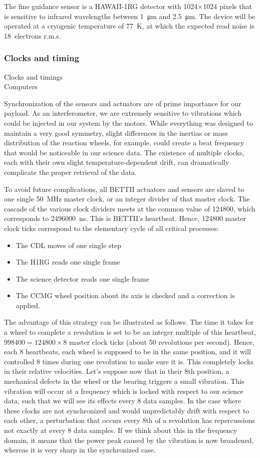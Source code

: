 The fine guidance sensor is a HAWAII-1RG detector with 1024$\times$1024 pixels that is sensitive to infrared wavelengths between \SI{1}{\um} and \SI{2.5}{\um}. The device will be operated at a cryogenic temperature of \SI{77}{\kelvin}, at which the expected read noise is 18~electrons r.m.s.

\subsubsection{Clocks and timing}
Clocks and timings \\
Computers

Synchronization of the sensors and actuators are of prime importance for our payload. As an interferometer, we are extremely sensitive to vibrations which could be injected in our system by the motors. While everything was designed to maintain a very good symmetry, slight differences in the inertias or mass distribution of the reaction wheels, for example, could create a beat frequency that would be noticeable in our science data. The existence of multiple clocks, each with their own slight temperature-dependent drift, can dramatically complicate the proper retrieval of the data.

To avoid future complications, all BETTII actuators and sensors are slaved to one single \SI{50}{\mega\hertz} master clock, or an integer divider of that master clock. The cascade of the various clock dividers meets at the common value of \num{124800}, which corresponds to \SI{2496000}{\nano\second}. This is BETTII's heartbeat. Hence, \num{124800} master clock ticks correspond to the elementary cycle of all critical processes:
\begin{itemize}
\item The CDL moves of one single step
\item The H1RG reads one single frame
\item The science detector reads one single frame
\item The CCMG wheel position about its axis is checked and a correction is applied.
\end{itemize}

The advantage of this strategy can be illustrated as follows. The time it takes for a wheel to complete a revolution is set to be an integer multiple of this heartbeat, $\num{998400}=\num{124800}\times 8$ master clock ticks (about 50 revolutions per second). Hence, each 8 heartbeats, each wheel is supposed to be in the same position, and it will controlled 8 times during one revolution to make sure it is. This completely locks in their relative velocities. Let's suppose now that in their 8th position, a mechanical defects in the wheel or the bearing triggers a small vibration. This vibration will occur at a frequency which is locked with respect to our science data, such that we will see its effects every 8 data samples. In the case where these clocks are not synchronized and would unpredictably drift with respect to each other, a perturbation that occurs every 8th of a revolution has repercussions not exactly at every 8 data samples. If we think about this in the frequency domain, it means that the power peak caused by the vibration is now broadened, whereas it is very sharp in the synchronized case.

